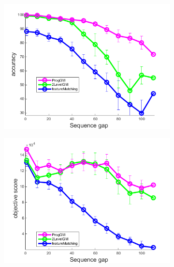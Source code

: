 \begin{figure}[h] \centering
		\begin{subfigure}[b]{0.33\textwidth}
			\centering
			\includegraphics[scale=0.25]{"chapter3/fig/HouseSeq2/anchor_descr/using_cpd_afftrafo/ext_solution/performance/accuracy"} 
		\end{subfigure} 
		\begin{subfigure}[b]{0.33\textwidth}
			\centering
			\includegraphics[scale=0.25]{"chapter3/fig/HouseSeq2/anchor_descr/using_cpd_afftrafo/ext_solution/performance/score"} 
		\end{subfigure}
		\begin{subfigure}[b]{0.32\textwidth}
			\centering

\end{subfigure}
\end{figure}
